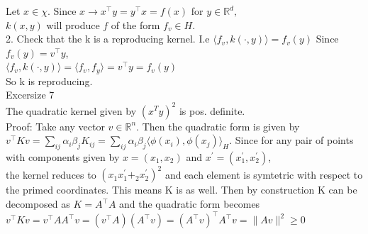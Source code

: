 \documentclass[18pt]{article}
\begin{document}
\begin{flushleft}
Let $x\in\chi$. Since $x\longrightarrow x^{\top}y=y^{\top}x=f(x)$ for $y\in \mathbb{R}^d,$\\
$k(x,y)$ will produce $f$ of the form $f_v\in H$.\\
\vspace{.4cm}
2. Check that the k is a reproducing kernel. I.e $ \langle f_v,k(\cdot,y)\rangle=f_v(y)$
\vspace{.4cm}
Since $f_v(y)=v^{\top}y$,\\
$\langle f_v,k(\cdot ,y)\rangle =\langle f_v,f_y\rangle=v^{\top}y=f_v(y)$\\
\vspace{.4cm}
So k is reproducing.\\
\vspace{.5cm}
Excersize 7\\
\vspace{.4cm}
The quadratic kernel given by $\left(x^Ty\right)^2$ is pos. definite.\\
\vspace{.4cm}
Proof: Take any vector $v\in\mathbb{R}^n$. Then the quadratic form is given by\\

$v^{\top}Kv=\sum_{ij}\alpha_i \beta_j K_{ij}=\sum_{ij} \alpha_i \beta_j \langle \phi(x_i),\phi(x_j)\rangle_H$.
Since for any pair of points with components given by $x=(x_1,x_2)$ and $x^{\prime}=(x^{\prime}_1,x^{\prime}_2)$,\\ the kernel reduces to $\left(x_1 x_1^{\prime}+_2 x_2^{\prime}\right)^2$ and each element is symtetric
with respect to the primed coordinates. This means K is as well. Then by construction K can be decomposed as $K=A^{\top}A$ and the quadratic form becomes\\
\vspace{.4cm}
$v^{\top}Kv=v^{\top}A A^{\top}v=\left(v^{\top}A\right)\left(A^{\top}v \right)=\left(A^{\top}v\right)^{\top} A^{\top}v=\parallel Av \parallel^2 \geq 0$\\




\end{flushleft}
\end{document}
